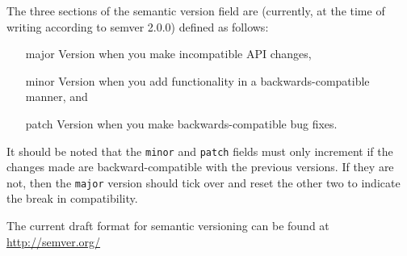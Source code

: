 The three sections of the semantic version field are (currently, at the time of writing according to semver 2.0.0) defined as follows:
\begin{enumerate}
    \item[major] Version when you make incompatible API changes,
    \item[minor] Version when you add functionality in a backwards-compatible manner, and
    \item[patch] Version when you make backwards-compatible bug fixes.
\end{enumerate}

It should be noted that the \texttt{minor} and \texttt{patch} fields must only increment if the changes made are backward-compatible with the previous versions. 
If they are not, then the \texttt{major} version should tick over and reset the other two to indicate the break in compatibility.

The current draft format for semantic versioning can be found at \url{http://semver.org/}
